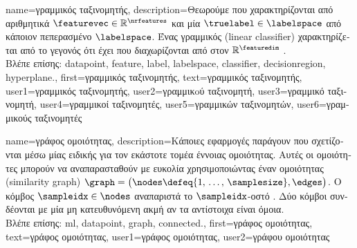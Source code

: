 {name={\foreignlanguage{greek}{γραμμικός ταξινομητής}}, 
	description={\foreignlanguage{greek}{Θεωρούμε} 
		 \foreignlanguage{greek}{που χαρακτηρίζονται από αριθμητικά}  
		$\featurevec \in \mathbb{R}^{\nrfeatures}$ \foreignlanguage{greek}{και μία}  $\truelabel \in \labelspace$ 
		\foreignlanguage{greek}{από κάποιον πεπερασμένο}  $\labelspace$. 
		\foreignlanguage{greek}{Ένας γραμμικός}  (linear classifier) \foreignlanguage{greek}{χαρακτηρίζεται από 
		το γεγονός ότι έχει}  \foreignlanguage{greek}{που διαχωρίζονται από}   
		\foreignlanguage{greek}{στον} $\mathbb{R}^{\featuredim}$ \cite[\foreignlanguage{greek}{Κεφ.} 2]{MLBasics}.
		\\
		\foreignlanguage{greek}{Βλέπε επίσης:} \gls{datapoint}, \gls{feature}, \gls{label}, \gls{labelspace}, \gls{classifier}, 
		\gls{decisionregion}, \gls{hyperplane}.},
	first={\foreignlanguage{greek}{γραμμικός ταξινομητής}},
	text={\foreignlanguage{greek}{γραμμικός ταξινομητής}},
	user1={\foreignlanguage{greek}{γραμμικός ταξινομητής}}, %
	user2={\foreignlanguage{greek}{γραμμι\-κoύ ταξινομητή}}, %
	user3={\foreignlanguage{greek}{γραμμικό ταξινομητή}}, %
	user4={\foreignlanguage{greek}{γραμμικοί ταξινομητές}}, %
	user5={\foreignlanguage{greek}{γραμμικών ταξινομητών}}, %
	user6={\foreignlanguage{greek}{γραμμικούς ταξινομητές}} %
}

{name={\foreignlanguage{greek}{γράφος ομοιότητας}}, 
 	description={\foreignlanguage{greek}{Κάποιες εφαρμογές}  
		\foreignlanguage{greek}{παράγουν}  \foreignlanguage{greek}{που σχετίζονται μέσω μίας ειδικής 
		για τον εκάστοτε τομέα έννοιας ομοιότητας. Αυτές οι ομοιότητες μπορούν να αναπαρασταθούν με ευκολία
 		χρησιμοποιώντας έναν}  \foreignlanguage{greek}{ομοιότητας} (similarity graph) 
		$\graph = \big(\nodes \defeq \{1, \,\ldots, \,\samplesize\},\edges\big)$. 
 		\foreignlanguage{greek}{Ο κόμβος $\sampleidx \in \nodes$ αναπαριστά το $\sampleidx$-οστό} . 
		\foreignlanguage{greek}{Δύο κόμβοι συνδέονται με μία μη κατευθυνόμενη ακμή αν τα αντίστοιχα}  
 		 \foreignlanguage{greek}{είναι όμοια}. 
		\\
		\foreignlanguage{greek}{Βλέπε επίσης:} \gls{ml}, \gls{datapoint}, \gls{graph}, \gls{connected}.},
 	first={\foreignlanguage{greek}{γράφος ομοιότητας}},
	text={\foreignlanguage{greek}{γράφος ομοιότητας}},
	user1={\foreignlanguage{greek}{γράφος ομοιότητας}}, %
  	user2={\foreignlanguage{greek}{γράφου ομοιότητας}} %
}

